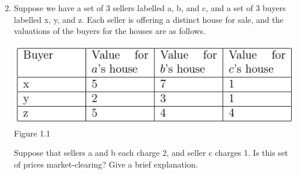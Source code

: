 \documentclass[11pt]{article}
\begin{document}
\begin{enumerate}
	\setcounter{enumi}{1}
	\item  Suppose we have a set of 3 sellers labelled a, b, and c, and a set of 3 buyers labelled x, y, and z. Each seller is offering a distinct house for sale, and the valuations of the buyers for the houses are as follows.
	\begin{center}
		\includegraphics[scale=1.5]{Figure1.1}\\
		Figure 1.1
	\end{center}
Suppose that sellers a and b each charge 2, and seller c charges 1. Is this set of prices
market-clearing? Give a brief explanation.
\end{enumerate}
\end{document}
